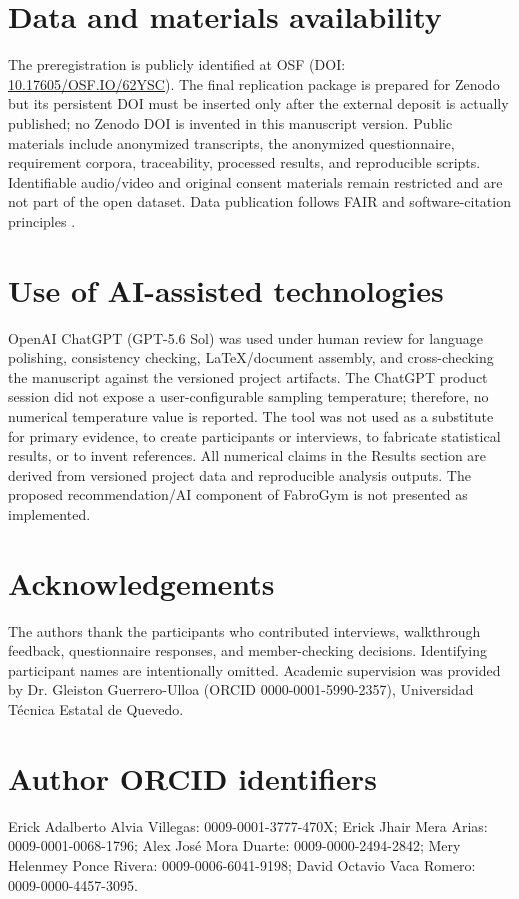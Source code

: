 \documentclass[pdflatex,sn-basic]{sn-jnl}
\begin{document}
\section*{Data and materials availability}
The preregistration is publicly identified at OSF (DOI: \href{https://doi.org/10.17605/OSF.IO/62YSC}{10.17605/OSF.IO/62YSC}). The final replication package is prepared for Zenodo but its persistent DOI must be inserted only after the external deposit is actually published; no Zenodo DOI is invented in this manuscript version. Public materials include anonymized transcripts, the anonymized questionnaire, requirement corpora, traceability, processed results, and reproducible scripts. Identifiable audio/video and original consent materials remain restricted and are not part of the open dataset. Data publication follows FAIR and software-citation principles \cite{wilkinson2016,smith2016,dicosmo2020}.

\section*{Use of AI-assisted technologies}
OpenAI ChatGPT (GPT-5.6 Sol) was used under human review for language polishing, consistency checking, LaTeX/document assembly, and cross-checking the manuscript against the versioned project artifacts. The ChatGPT product session did not expose a user-configurable sampling temperature; therefore, no numerical temperature value is reported. The tool was not used as a substitute for primary evidence, to create participants or interviews, to fabricate statistical results, or to invent references. All numerical claims in the Results section are derived from versioned project data and reproducible analysis outputs. The proposed recommendation/AI component of FabroGym is not presented as implemented.

\section*{Acknowledgements}
The authors thank the participants who contributed interviews, walkthrough feedback, questionnaire responses, and member-checking decisions. Identifying participant names are intentionally omitted. Academic supervision was provided by Dr. Gleiston Guerrero-Ulloa (ORCID 0000-0001-5990-2357), Universidad T{\'e}cnica Estatal de Quevedo.

\section*{Author ORCID identifiers}
Erick Adalberto Alvia Villegas: 0009-0001-3777-470X; Erick Jhair Mera Arias: 0009-0001-0068-1796; Alex Jos{\'e} Mora Duarte: 0009-0000-2494-2842; Mery Helenmey Ponce Rivera: 0009-0006-6041-9198; David Octavio Vaca Romero: 0009-0000-4457-3095.
\end{document}

